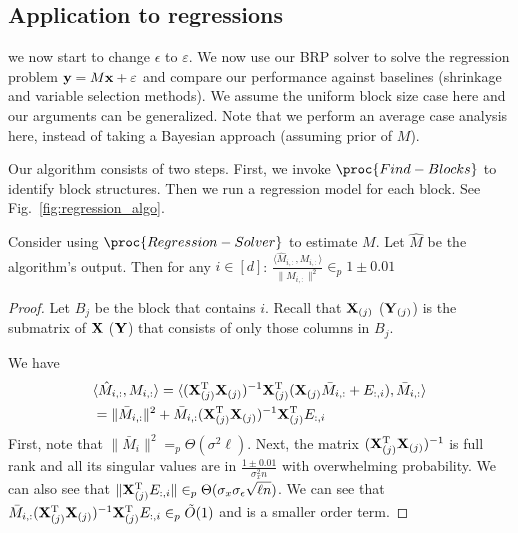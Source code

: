 \subsection{Application to regressions}
{\color{red} we now start to change $\epsilon$ to $\varepsilon$.}
We now use our BRP solver to solve the regression problem $\mathbf{y} = M \mathbf{x} + \varepsilon$ and compare our performance against baselines (shrinkage and variable selection methods). We assume the uniform block size case here and our arguments can be generalized. Note that we perform an average case analysis here, instead of taking a Bayesian approach (assuming prior of $M$). 

Our algorithm consists of two steps. First, we invoke $\proc{Find-Blocks}$ to identify block structures. Then we run a regression model for each block. See Fig.~\ref{fig:regression_algo}. 

\begin{lemma}\label{lem:regression} Consider using $\proc{Regression-Solver}$ to estimate $M$. Let $\hat M$ be the algorithm's output. Then for any $i \in [d]$:
$\frac{\langle \hat M_{i, :}, M_{i, :}\rangle}{\|M_{i, :}\|^2} \in_p 1\pm 0.01$
\end{lemma}


\begin{proof}Let $B_j$ be the block that contains $i$. Recall that $\mathbf{X}_{(j)}$ ($\mathbf{Y}_{(j)}$) is the submatrix of $\mathbf{X}$ ($\mathbf{Y}$) that consists of only those columns in $B_j$. 

We have 
\begin{equation}
    \begin{split}
    & \langle \hat M_{i, :}, M_{i, :} \rangle
     = \langle (\mathbf{X}^{\mathrm{T}}_{(j)}\mathbf{X}_{(j)})^{-1}\mathbf{X}^{\mathrm{T}}_{(j)}(\mathbf{X}_{(j)} \bar M_{i, :} + E_{:, i}), \bar M_{i, :} \rangle \\
     &= \|\bar M_{i, :}\|^2 + \bar M_{i, :}  (\mathbf{X}^{\mathrm{T}}_{(j)}\mathbf{X}_{(j)})^{-1}\mathbf{X}^{\mathrm{T}}_{(j)}E_{:, i}
    \end{split}
\end{equation}
First, note that $\|\bar M_{i}\|^2 =_p \Theta(\sigma^2 \ell)$. Next, the matrix $(\mathbf{X}^{\mathrm{T}}_{(j)}\mathbf{X}_{(j)})^{-1}$ is full rank and all its singular values are in $\frac{1\pm 0.01}{\sigma^2_x n}$ with overwhelming probability. We can also see that $\|\mathbf{X}^{\mathrm{T}}_{(j)}E_{:, i}\| \in_p \Theta(\sigma_x \sigma_{\epsilon}\sqrt{\ell n})$. We can see that $\bar M_{i, :}  (\mathbf{X}^{\mathrm{T}}_{(j)}\mathbf{X}_{(j)})^{-1}\mathbf{X}^{\mathrm{T}}_{(j)}E_{:, i} \in_p \tilde O(1)$ and is a smaller order term. 
\end{proof}

